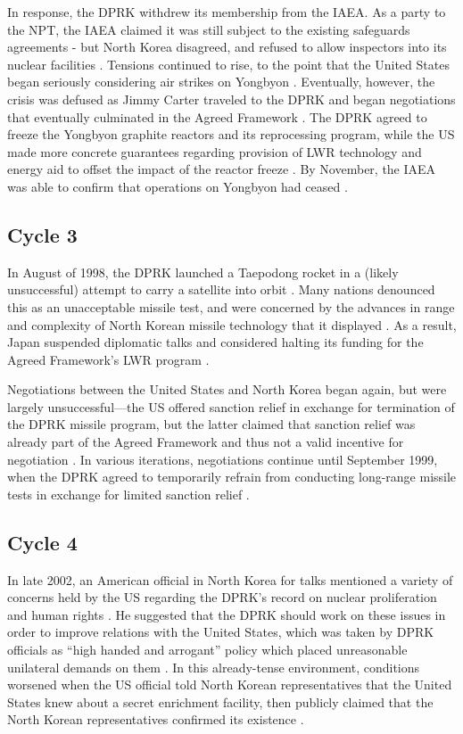 In response, the DPRK withdrew its membership from the IAEA. As a party to the NPT, the IAEA claimed it was still subject to the existing safeguards agreements - but North Korea disagreed, and refused to allow inspectors into its nuclear facilities \cite{iaea09}. Tensions continued to rise, to the point that the United States began seriously considering air strikes on Yongbyon \cite{jun}. Eventually, however, the crisis was defused as Jimmy Carter traveled to the DPRK and began negotiations that eventually culminated in the Agreed Framework \cite{nti15}. The DPRK agreed to freeze the Yongbyon graphite reactors and its reprocessing program, while the US made more concrete guarantees regarding provision of LWR technology and energy aid to offset the impact of the reactor freeze \cite{agreed}. By November, the IAEA was able to confirm that operations on Yongbyon had ceased \cite{davenport}.

\subsection{Cycle 3}

In August of 1998, the DPRK launched a Taepodong rocket in a (likely unsuccessful) attempt to carry a satellite into orbit \cite{orfall}. Many nations denounced this as an unacceptable missile test, and were concerned by the advances in range and complexity of North Korean missile technology that it displayed \cite{orfall}. As a result, Japan suspended diplomatic talks and considered halting its funding for the Agreed Framework's LWR program \cite{orfall}.

Negotiations between the United States and North Korea began again, but were largely unsuccessful---the US offered sanction relief in exchange for termination of the DPRK missile program, but the latter claimed that sanction relief was already part of the Agreed Framework and thus not a valid incentive for negotiation \cite{davenport}. In various iterations, negotiations continue until September 1999, when the DPRK agreed to temporarily refrain from conducting long-range missile tests in exchange for limited sanction relief \cite{davenport}.

\subsection{Cycle 4}

In late 2002, an American official in North Korea for talks mentioned a variety of concerns held by the US regarding the DPRK's record on nuclear proliferation and human rights \cite{davenport}. He suggested that the DPRK should work on these issues in order to improve relations with the United States, which was taken by DPRK officials as ``high handed and arrogant'' policy which placed unreasonable unilateral demands on them \cite{kcna3}. In this already-tense environment, conditions worsened when the US official told North Korean representatives that the United States knew about a secret enrichment facility, then publicly claimed that the North Korean representatives confirmed its existence \cite{davenport}. 


